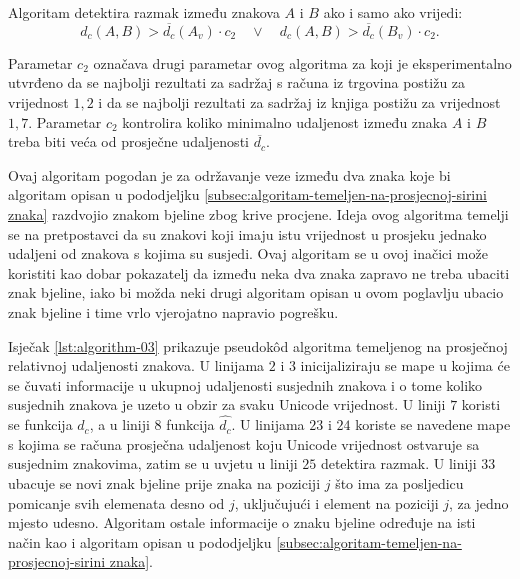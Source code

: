 \documentclass[times, utf8, zavrsni]{fer}
\begin{document}
Algoritam detektira razmak između znakova $A$ i $B$ ako i samo ako vrijedi:
\begin{equation}
\label{eq:relative-distance-03}
    d_c(A, B) > \overline{d_c}(A_v) \cdot c_2 \quad \lor \quad
    d_c(A, B) > \overline{d_c}(B_v) \cdot c_2 \texttt{.}
\end{equation}

Parametar $c_2$ označava drugi parametar ovog algoritma za koji je
eksperimentalno utvrđeno da se najbolji rezultati za sadržaj s računa iz
trgovina postižu za vrijednost $1{,}2$ i da se najbolji rezultati za sadržaj iz
knjiga postižu za vrijednost $1{,}7$. Parametar $c_2$ kontrolira koliko
minimalno udaljenost između znaka $A$ i $B$ treba biti veća od prosječne
udaljenosti $\overline{d_c}$.

Ovaj algoritam pogodan je za održavanje veze između dva znaka koje bi
algoritam opisan u pododjeljku
\ref{subsec:algoritam-temeljen-na-prosjecnoj-sirini znaka} razdvojio znakom
bjeline zbog krive procjene. Ideja ovog algoritma temelji se na
pretpostavci da su znakovi koji imaju istu vrijednost u prosjeku jednako
udaljeni od znakova s kojima su susjedi. Ovaj algoritam se u ovoj
inačici može koristiti kao dobar pokazatelj da između neka dva znaka zapravo
ne treba ubaciti znak bjeline, iako bi možda neki drugi algoritam opisan u ovom
poglavlju ubacio znak bjeline i time vrlo vjerojatno napravio pogrešku.

Isječak \ref{lst:algorithm-03} prikazuje pseudokôd algoritma temeljenog na
prosječnoj relativnoj udaljenosti znakova. U linijama $2$ i $3$ inicijaliziraju
se mape u kojima će se čuvati informacije u ukupnoj udaljenosti susjednih
znakova i o tome koliko susjednih znakova je uzeto u obzir za svaku Unicode
vrijednost. U liniji $7$ koristi se funkcija $d_c$, a u liniji $8$ funkcija
$\hat{d_c}$. U linijama $23$ i $24$ koriste se navedene mape s kojima se računa
prosječna udaljenost koju Unicode vrijednost ostvaruje sa susjednim znakovima,
zatim se u uvjetu u liniji $25$ detektira razmak. U liniji $33$
ubacuje se novi znak bjeline prije znaka na poziciji $j$ što ima za posljedicu
pomicanje svih elemenata desno od $j$, uključujući i element na poziciji $j$,
za jedno mjesto udesno. Algoritam ostale informacije o znaku bjeline
određuje na isti način kao i algoritam opisan u pododjeljku
\ref{subsec:algoritam-temeljen-na-prosjecnoj-sirini znaka}.

\pagebreak
\end{document}
